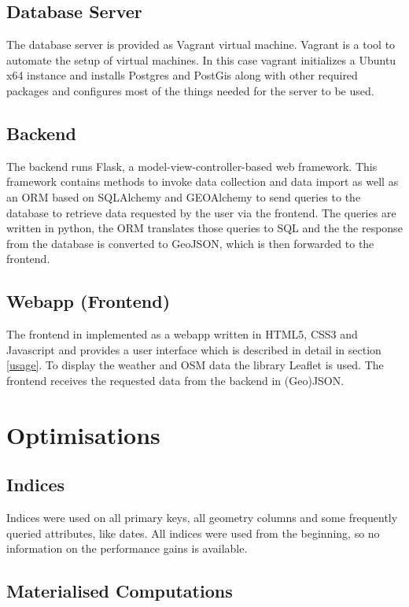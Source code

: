 \documentclass[paper=a4, fontsize=11pt]{article} %
\numberwithin{equation}{section} %
\numberwithin{figure}{section} %
\numberwithin{table}{section} %
\begin{document}
\subsection{Database Server}
The database server is provided as Vagrant virtual machine. Vagrant is a tool to automate the setup of virtual machines. In this case vagrant initializes a Ubuntu x64 instance and installs Postgres and PostGis along with other required packages and configures most of the things needed for the server to be used.
\subsection{Backend}
The backend runs Flask, a model-view-controller-based web framework. This framework contains methods to invoke data collection and data import as well as an ORM based on SQLAlchemy and GEOAlchemy to send queries to the database to retrieve data requested by the user via the frontend. The queries are written in python, the ORM translates those queries to SQL and the the response from the database is converted to GeoJSON, which is then forwarded to the frontend.
\subsection{Webapp (Frontend)}\label{subsec:webapp}
The frontend in implemented as a webapp written in HTML5, CSS3 and Javascript and provides a user interface which is described in detail in section \ref{usage}. To display the weather and OSM data the library Leaflet is used. The frontend receives the requested data from the backend in (Geo)JSON.


\section{Optimisations}\label{sec:optimisation}

\subsection{Indices}

Indices were used on all primary keys, all geometry columns and some frequently queried attributes, like dates. All indices were used from the beginning, so no information on the performance gains is available.

\subsection{Materialised Computations}\label{subsec:opticontrib}
\end{document}

